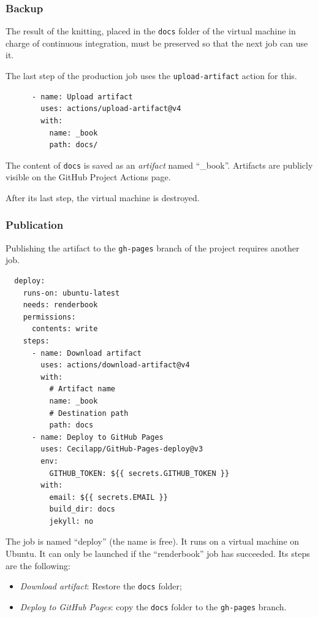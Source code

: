 \documentclass[
  12pt,
  american,
  a4paper,
  extrafontsizes,onecolumn,openright
  ]{memoir}
\providecommand{\tightlist}{%
  \setlength{\itemsep}{0pt}\setlength{\parskip}{0pt}}
\begin{document}
\subsubsection{Backup}\label{backup}

The result of the knitting, placed in the \texttt{docs} folder of the virtual machine in charge of continuous integration, must be preserved so that the next job can use it.

The last step of the production job uses the \texttt{upload-artifact} action for this.

\begin{verbatim}
      - name: Upload artifact
        uses: actions/upload-artifact@v4
        with:
          name: _book
          path: docs/
\end{verbatim}

The content of \texttt{docs} is saved as an \emph{artifact} named ``\_book''.
Artifacts are publicly visible on the GitHub Project Actions page.

After its last step, the virtual machine is destroyed.

\subsubsection{Publication}\label{publication}

Publishing the artifact to the \texttt{gh-pages} branch of the project requires another job.

\begin{verbatim}
  deploy:
    runs-on: ubuntu-latest
    needs: renderbook
    permissions:
      contents: write
    steps:
      - name: Download artifact
        uses: actions/download-artifact@v4
        with:
          # Artifact name
          name: _book
          # Destination path
          path: docs
      - name: Deploy to GitHub Pages
        uses: Cecilapp/GitHub-Pages-deploy@v3
        env:
          GITHUB_TOKEN: ${{ secrets.GITHUB_TOKEN }}
        with:
          email: ${{ secrets.EMAIL }}
          build_dir: docs
          jekyll: no
\end{verbatim}

The job is named \enquote{deploy} (the name is free).
It runs on a virtual machine on Ubuntu.
It can only be launched if the \enquote{renderbook} job has succeeded.
Its steps are the following:

\begin{itemize}
\tightlist
\item
  \emph{Download artifact}: Restore the \texttt{docs} folder;
\item
  \emph{Deploy to GitHub Pages}: copy the \texttt{docs} folder to the \texttt{gh-pages} branch.
\end{itemize}
\end{document}
